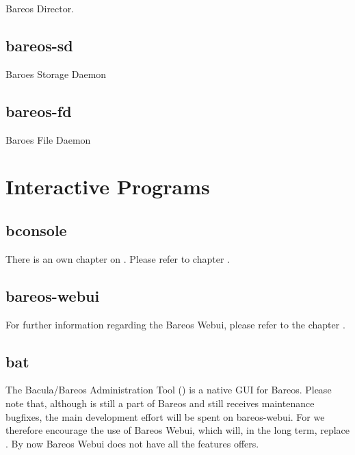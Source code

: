 Bareos Director.

\subsection{bareos-sd}
\label{command-bareos-sd}

Baroes Storage Daemon


\subsection{bareos-fd}
\label{command-bareos-fd}

Baroes File Daemon


\section{Interactive Programs}

\subsection{bconsole}

There is an own chapter on .
Please refer to chapter .

\subsection{bareos-webui}

For further information regarding the Bareos Webui, please refer to the chapter .

\subsection{bat}
\label{bat}

The Bacula/Bareos Administration Tool () is a native GUI for Bareos. Please note that, although  is still a part of Bareos and still receives maintenance bugfixes, the main development effort will be spent on bareos-webui. For  we therefore encourage the use of Bareos Webui, which will, in the long term, replace . By now Bareos Webui does not have all the features  offers.


